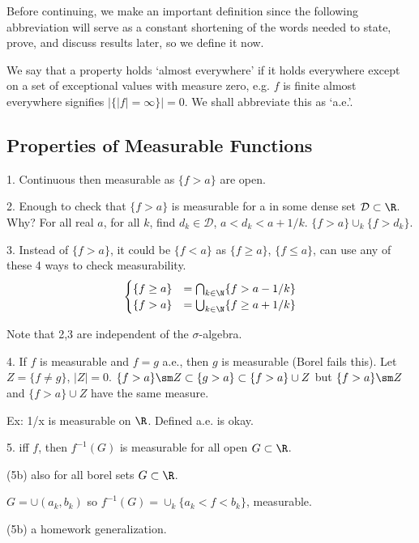 Before continuing, we make an important definition since the following abbreviation will serve as a constant shortening of the words needed to state, prove, and discuss results later, so we define it now.


\begin{dfn}
We say that a property holds `almost everywhere' if it holds everywhere except on a set of exceptional values with measure zero, e.g. $f$ is finite almost everywhere signifies $|\{ |f|=\infty\}|=0$. We shall abbreviate this as `a.e.'.
\end{dfn}




\subsection{Properties of Measurable Functions}

1. Continuous then measurable as $\{f>a\}$ are open.

2. Enough to check that $\{f>a\}$ is measurable for a in some dense set $\mathcal{D} \subset \R$. Why? For all real $a$, for all $k$, find $d_k \in \mathcal{D}$, $a<d_k<a+1/k$. $\{f>a\} \cup_k \{f>d_k\}$.

3. Instead of $\{f>a\}$, it could be $\{f<a\}$ as $\{f \geq a\}$, $\{ f \leq a\}$, can use any of these 4 ways to check measurability.
	\[
	\begin{cases}
	\{f \geq a\}&= \bigcap_{k \in \N} \{f>a-1/k\} \\
	\{f>a\}&= \bigcup_{k \in \N} \{f \geq a+1/k\}
	\end{cases}
	\]

Note that 2,3 are independent of the $\sigma$-algebra. 


4. If $f$ is measurable and $f=g$ a.e., then $g$ is measurable (Borel fails this). Let $Z=\{f \neq g\}$, $|Z|=0$. $\{f>a\} \sm Z \subset \{g>a\} \subset \{f>a\} \cup Z$ but $\{f>a\} \sm Z$ and $\{f>a\} \cup Z$ have the same measure. 

Ex: 1/x is measurable on $\R$. Defined a.e. is okay. 


5. iff $f$, then $f^{-1}(G)$ is measurable for all open $G \subset \R$.

(5b) also for all borel sets $G \subset \R$.

\pf $G= \cup (a_k,b_k)$ so $f^{-1}(G)= \cup_k \{a_k<f<b_k\}$, measurable.

\pf (5b) a homework generalization. 

